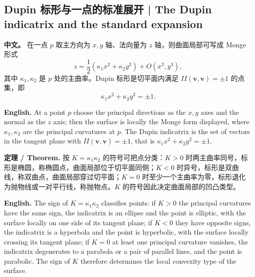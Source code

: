 \documentclass[UTF8,11pt,a4paper]{ctexart}
\newcommand{\APS}[2]{\par\noindent\textbf{中文。} #1\par\noindent\textbf{English.} #2\par\smallskip}
\newcommand{\EN}[1]{\par\noindent \textbf{English.} #1\par}
\newcommand{\THM}[2]{\par\noindent\textbf{定理 / Theorem.} #1\par\EN{#2}\par\smallskip}
\newcommand{\bv}{\mathbf{v}}
\begin{document}
\subsection{Dupin 标形与一点的标准展开 | The Dupin indicatrix and the standard expansion}
\APS{在一点 $p$ 取主方向为 $x,y$ 轴、法向量为 $z$ 轴，则曲面局部可写成 Monge 形式
\[
z=\frac12\left(\kappa_1x^2+\kappa_2y^2\right)+O(x^3,y^3),
\]
其中 $\kappa_1,\kappa_2$ 是 $p$ 处的主曲率。Dupin 标形是切平面内满足 $II(\bv,\bv)=\pm1$ 的点集，即
\[
\kappa_1x^2+\kappa_2y^2=\pm1 .
\]
}{At a point $p$ choose the principal directions as the $x,y$ axes and the normal as the $z$ axis; then the surface is locally the Monge form displayed, where $\kappa_1,\kappa_2$ are the principal curvatures at $p$. The Dupin indicatrix is the set of vectors in the tangent plane with $II(\bv,\bv)=\pm1$, that is $\kappa_1x^2+\kappa_2y^2=\pm1$.}
\THM{按 $K=\kappa_1\kappa_2$ 的符号可把点分类：$K>0$ 时两主曲率同号，标形是椭圆，称椭圆点，曲面局部位于切平面同侧；$K<0$ 时异号，标形是双曲线，称双曲点，曲面局部穿过切平面；$K=0$ 时至少一个主曲率为零，标形退化为抛物线或一对平行线，称抛物点。$K$ 的符号因此决定曲面局部的凹凸类型。}{The sign of $K=\kappa_1\kappa_2$ classifies points: if $K>0$ the principal curvatures have the same sign, the indicatrix is an ellipse and the point is elliptic, with the surface locally on one side of its tangent plane; if $K<0$ they have opposite signs, the indicatrix is a hyperbola and the point is hyperbolic, with the surface locally crossing its tangent plane; if $K=0$ at least one principal curvature vanishes, the indicatrix degenerates to a parabola or a pair of parallel lines, and the point is parabolic. The sign of $K$ therefore determines the local convexity type of the surface.}
\end{document}
